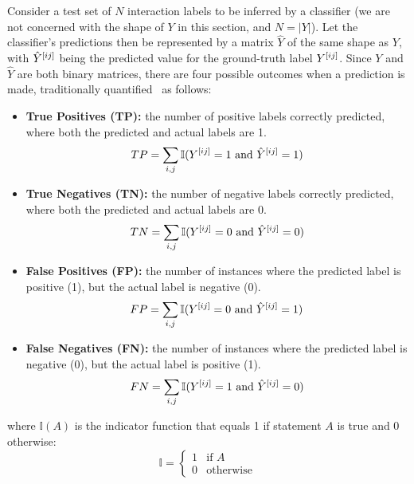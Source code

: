 Consider a test set of $N$ interaction labels to be inferred by a classifier (we are not concerned with the shape of $Y$ in this section, and $N=|Y|$). Let the classifier's predictions then be represented by a matrix $\hat Y$ of the same shape as $Y$, with $\hat Y^{[ij]}$ being the predicted value for the ground-truth label $Y^{[ij]}$. Since $Y$ and $\hat Y$ are both binary matrices, there are four possible outcomes when a prediction is made, traditionally quantified~\cite{powers2020evaluation} as follows:
%
\begin{itemize}
    \item \textbf{True Positives (TP):} the number of positive labels correctly predicted, where both the predicted and actual labels are 1.
    \begin{equation}
        TP = \sum_{i,j} \mathbb{I}(Y^{[ij]} = 1 \text{ and } \hat{Y}^{[ij]} = 1)
    \end{equation}

    \item \textbf{True Negatives (TN):} the number of negative labels correctly predicted, where both the predicted and actual labels are 0.
    \begin{equation}
        TN = \sum_{i,j} \mathbb{I}(Y^{[ij]} = 0 \text{ and } \hat{Y}^{[ij]} = 0)
    \end{equation}

    \item \textbf{False Positives (FP):} the number of instances where the predicted label is positive (1), but the actual label is negative (0).
    \begin{equation}
        FP = \sum_{i,j} \mathbb{I}(Y^{[ij]} = 0 \text{ and } \hat{Y}^{[ij]} = 1)
    \end{equation}

    \item \textbf{False Negatives (FN):} the number of instances where the predicted label is negative (0), but the actual label is positive (1).
    \begin{equation}
        FN = \sum_{i,j} \mathbb{I}(Y^{[ij]} = 1 \text{ and } \hat{Y}^{[ij]} = 0)
    \end{equation}
\end{itemize}
%
where \(\mathbb{I}(A)\) is the indicator function that equals 1 if statement \(A\) is true and 0 otherwise:
%
\begin{equation} %
    \mathbb{I} = \begin{cases}
        1 & \text{if } A\\
        0 & \text{otherwise}
    \end{cases}
    \label{eq:indicator}
\end{equation}
